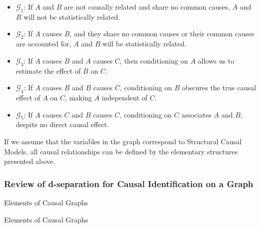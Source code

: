\documentclass[
  single column]{article}
\providecommand{\tightlist}{%
  \setlength{\itemsep}{0pt}\setlength{\parskip}{0pt}}\usepackage{longtable,booktabs,array}
\begin{document}
\begin{itemize}
\tightlist
\item
  \textbf{\(\mathcal{G}_1\)}: If \(A\) and \(B\) are not causally
  related and share no common causes, \(A\) and \(B\) will not be
  statistically related.
\item
  \textbf{\(\mathcal{G}_2\)}: If \(A\) causes \(B\), and they share no
  common causes or their common causes are accounted for, \(A\) and
  \(B\) will be statistically related.
\item
  \textbf{\(\mathcal{G}_3\)}: If \(A\) causes \(B\) and \(A\) causes
  \(C\), then conditioning on \(A\) allows us to estimate the effect of
  \(B\) on \(C\).
\item
  \textbf{\(\mathcal{G}_4\)}: If \(A\) causes \(B\) and \(B\) causes
  \(C\), conditioning on \(B\) obscures the true causal effect of \(A\)
  on \(C\), making \(A\) independent of \(C\).
\item
  \textbf{\(\mathcal{G}_5\)}: If \(A\) causes \(C\) and \(B\) causes
  \(C\), conditioning on \(C\) associates \(A\) and \(B\), despite no
  direct causal effect.
\end{itemize}

If we assume that the variables in the graph correspond to Structural
Causal Models, all causal relationships can be defined by the elementary
structures presented above.

\subsubsection{Review of d-separation for Causal Identification on a
Graph}\label{review-of-d-separation-for-causal-identification-on-a-graph}

\begin{table}

\caption{\label{tbl-terminologygeneral}Elements of Causal Graphs}

\centering{

\terminologydirectedgraph

}

\end{table}%

\begin{table}

\caption{\label{tbl-terminologygeneral}Elements of Causal Graphs}

\centering{

\terminologyeffectmodification

}

\end{table}%
\end{document}
